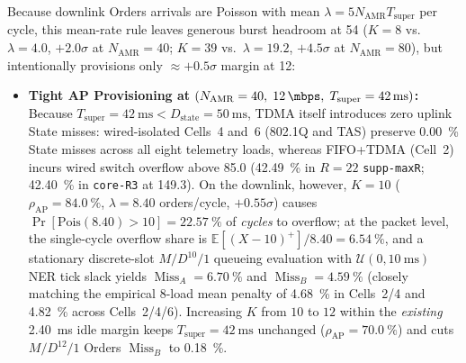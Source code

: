 \documentclass[11pt,a4paper]{article}
\newcommand{\Namr}{\ensuremath{N_{\mathrm{AMR}}}}
\newcommand{\Tsuper}{\ensuremath{T_{\mathrm{super}}}}
\newcommand{\MissA}{\ensuremath{\operatorname{Miss}_A}}
\newcommand{\MissB}{\ensuremath{\operatorname{Miss}_B}}
\begin{document}
Because downlink Orders arrivals are Poisson with mean $\lambda = 5\Namr\Tsuper$ per cycle, this mean-rate rule leaves generous burst headroom at \qty{54}{\mbps} ($K=8$ vs.\ $\lambda=4.0$, $+2.0\sigma$ at $\Namr=40$; $K=39$ vs.\ $\lambda=19.2$, $+4.5\sigma$ at $\Namr=80$), but intentionally provisions only $\approx +0.5\sigma$ margin at \qty{12}{\mbps}:
\begin{itemize}[leftmargin=1.8em]
    \item \textbf{Tight AP Provisioning at $(\Namr=40,\; \qty{12}{\mbps},\; \Tsuper=\qty{42}{\milli\second})$:} Because $\Tsuper = \qty{42}{\milli\second} < D_{\mathrm{state}} = \qty{50}{\milli\second}$, TDMA itself introduces zero uplink State misses: wired-isolated Cells~4 and~6 (802.1Q and TAS) preserve \qty{0.00}{\percent} State misses across all eight telemetry loads, whereas FIFO+TDMA (Cell~2) incurs wired switch overflow above \qty{85.0}{\mbps} (\qty{42.49}{\percent} in $R=22$ \texttt{supp-maxR}; \qty{42.40}{\percent} in \texttt{core-R3} at \qty{149.3}{\mbps}). On the downlink, however, $K=10$ ($\rho_{\mathrm{AP}} = \qty{84.0}{\percent}$, $\lambda = 8.40$ orders/cycle, $+0.55\sigma$) causes $\Pr[\mathrm{Pois}(8.40) > 10] = \qty{22.57}{\percent}$ of \emph{cycles} to overflow; at the packet level, the single-cycle overflow share is $\mathbb{E}[(X-10)^+]/8.40 = \qty{6.54}{\percent}$, and a stationary discrete-slot $M/D^{10}/1$ queueing evaluation with $\mathcal{U}(0, \qty{10}{\milli\second})$ NER tick slack yields $\MissA = \qty{6.70}{\percent}$ and $\MissB = \qty{4.59}{\percent}$ (closely matching the empirical 8-load mean penalty of \qty{4.68}{\percent} in Cells~2/4 and \qty{4.82}{\percent} across Cells~2/4/6). Increasing $K$ from $10$ to $12$ within the \emph{existing} \qty{2.40}{\milli\second} idle margin keeps $\Tsuper = \qty{42}{\milli\second}$ unchanged ($\rho_{\mathrm{AP}} = \qty{70.0}{\percent}$) and cuts $M/D^{12}/1$ Orders $\MissB$ to \qty{0.18}{\percent}.

\end{itemize}
\end{document}
